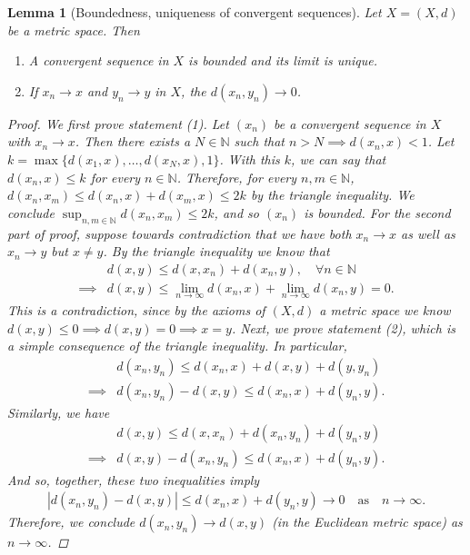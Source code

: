 \documentclass[11pt]{article}
\theoremstyle{mystyle}
\newtheorem{lm}{Lemma}[section]
\newcommand{\0}{\mathbf{0}}
\begin{document}
\begin{lm}[Boundedness, uniqueness of convergent sequences]\label{uniquelimit}
Let $X = (X, d)$ be a metric space. Then
\begin{enumerate}
    \item A convergent sequence in $X$ is bounded and its limit is unique.
    \item If $x_n \longrightarrow x$ and $y_n \longrightarrow y$ in $X$, the  $d(x_n, y_n) \longrightarrow 0$.
\end{enumerate}
\begin{proof}
We first prove statement (1). Let $(x_n)$ be a convergent sequence in $X$ with $x_n \longrightarrow x$. Then there exists a $N \in \mathbb{N}$ such that $n > N \implies d(x_n, x) < 1$. Let $k = \max \{ d(x_1, x), \ldots, d(x_N, x), 1\}$. With this $k$, we can say that $d(x_n, x) \leq k$ for every $n \in \mathbb{N}$. Therefore, for every $n, m \in \mathbb{N}$, $d(x_n, x_m) \leq d(x_n, x) + d(x_m, x) \leq 2k$ by the triangle inequality. We conclude $\sup_{n, m \in \mathbb{N}} d(x_n, x_m) \leq 2k$, and so $(x_n)$ is bounded.\newline
For the second part of proof, suppose towards contradiction that we have both $x_n \longrightarrow x$ as well as $x_n \longrightarrow y$ but $x \neq y$. By the triangle inequality we know that
\begin{align*}
    &d(x, y) \leq d(x, x_n) + d(x_n, y), \quad \forall n \in \mathbb{N}\\
    \implies& d(x, y) \leq \lim_{n \to \infty} d(x_n, x) + \lim_{n \to \infty} d(x_n, y) = 0.
\end{align*}
This is a contradiction, since by the axioms of $(X, d)$ a metric space we know $d(x,y) \leq 0 \implies d(x, y) = 0 \implies x = y$.\newline
Next, we prove statement (2), which is a simple consequence of the triangle inequality. In particular,
\begin{align*}
    &d(x_n, y_n) \leq d(x_n, x) + d(x, y) + d(y, y_n)\\
    \implies& d(x_n, y_n) - d(x, y) \leq d(x_n, x) + d(y_n, y).
\end{align*}
Similarly, we have
\begin{align*}
    &d(x, y) \leq d(x, x_n) + d(x_n, y_n) + d(y_n, y)\\
    \implies&d(x, y) - d(x_n, y_n) \leq d(x_n, x) + d(y_n,y).
\end{align*}
And so, together, these two inequalities imply
\begin{align*}
    | d(x_n, y_n) - d(x, y) | \leq d(x_n, x) + d(y_n,y) \longrightarrow 0 \quad \text{as} \quad n \longrightarrow \infty.
\end{align*}
Therefore, we conclude $d(x_n, y_n) \longrightarrow d(x, y)$ (in the Euclidean metric space) as $n \longrightarrow \infty$.
\end{proof}

\end{lm}
\end{document}
